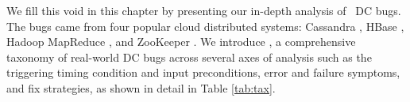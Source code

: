 We fill this void in this chapter by presenting our in-depth analysis of
\numDcBugs\ DC bugs.  The bugs came from four popular cloud distributed
systems: Cassandra \cite{CassandraWeb}, HBase \cite{HBaseWeb}, Hadoop MapReduce
\cite{HadoopWeb}, and ZooKeeper \cite{ZooKeeperWeb}.
%
We introduce \taxdc, a comprehensive taxonomy of real-world DC bugs across
several axes of analysis such as the triggering timing condition and input
preconditions, error and failure symptoms, and fix strategies, as shown in
detail in Table \ref{tab:tax}.
\fi
